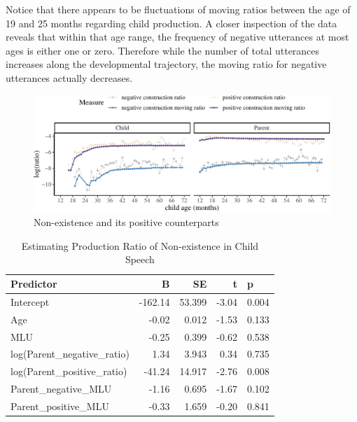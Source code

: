 \documentclass[
  english,
  man,floatsintext]{apa6}
\begin{document}
Notice that there appears to be fluctuations of moving ratios between the age of 19 and 25 months regarding child production. A closer inspection of the data reveals that within that age range, the frequency of negative utterances at most ages is either one or zero. Therefore while the number of total utterances increases along the developmental trajectory, the moving ratio for negative utterances actually decreases.

\begin{figure}[H]

{\centering \includegraphics{neg_construction_article_files/figure-latex/existence-1} 

}

\caption{Non-existence and its positive counterparts}\label{fig:existence}
\end{figure}

\clearpage

\begin{table}

\caption{\label{tab:unnamed-chunk-3}Estimating Production Ratio of Non-existence in Child Speech}
\centering
\begin{tabular}[t]{l|r|r|r|l}
\hline
Predictor & B & SE & t & p\\
\hline
Intercept & -162.14 & 53.399 & -3.04 & 0.004\\
\hline
Age & -0.02 & 0.012 & -1.53 & 0.133\\
\hline
MLU & -0.25 & 0.399 & -0.62 & 0.538\\
\hline
log(Parent\_negative\_ratio) & 1.34 & 3.943 & 0.34 & 0.735\\
\hline
log(Parent\_positive\_ratio) & -41.24 & 14.917 & -2.76 & 0.008\\
\hline
Parent\_negative\_MLU & -1.16 & 0.695 & -1.67 & 0.102\\
\hline
Parent\_positive\_MLU & -0.33 & 1.659 & -0.20 & 0.841\\
\hline
\end{tabular}
\end{table}
\end{document}
